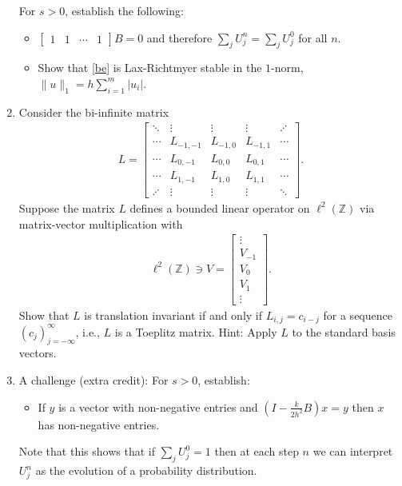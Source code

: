 \documentclass[10pt]{amsart}
\begin{document}
\begin{enumerate}[label={\bf Problem~{\arabic*}:}]
  
      \noindent For $s > 0$, establish the following:
       \begin{itemize}
       \item $\begin{bmatrix} 1 & 1 & \cdots & 1 \end{bmatrix} B = 0$ and therefore $\sum_j U_j^n = \sum_j U_j^0$ for all $n$.
         \item  Show that \eqref{be} is Lax-Richtmyer stable in the $1$-norm, $\|u\|_1 = h \sum_{i=1}^m |u_i|$.
    \end{itemize}
     
    \mline
    \item Consider the bi-infinite matrix
    \begin{align*}
      L = \begin{bmatrix}
        \ddots & \vdots & \vdots & \vdots  & \iddots \\
        \cdots & L_{-1,-1} & L_{-1,0} & L_{-1,1} & \cdots \\
        \cdots & L_{0,-1} & L_{0,0} & L_{0,1} & \cdots \\
        \cdots & L_{1,-1} & L_{1,0} & L_{1,1} & \cdots \\
        \iddots & \vdots & \vdots & \vdots & \ddots
      \end{bmatrix}.                
    \end{align*}
    Suppose the matrix $L$ defines a bounded linear operator on $\ell^2(\mathbb Z)$ via matrix-vector multiplication with
    \begin{align*}
     \ell^2(\mathbb Z) \ni V = \begin{bmatrix} \vdots \\ V_{-1} \\ V_0 \\ V_1 \\\vdots \end{bmatrix}.
    \end{align*}
    Show that $L$ is translation invariant if and only if $L_{i,j} = c_{i - j}$ for a sequence $(c_j)_{j=-\infty}^\infty$, i.e., $L$ is a Toeplitz matrix.  Hint: Apply $L$ to the standard basis vectors.

    
\mline 
  
\item A challenge (extra credit):  For $s > 0$, establish:
  \begin{itemize}
  \item If $y$ is a vector with non-negative entries and $\left( I - \frac{k}{2h^2}B \right) x = y$ then $x$ has non-negative entries.
  \end{itemize}
  Note that this shows that if $\sum_j U_j^0 =1$ then at each step $n$ we can interpret $U_j^n$ as the evolution of a probability distribution.
  
  \end{enumerate}
\end{document}
